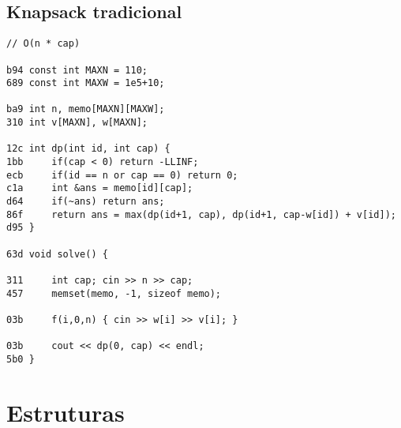 \documentclass[11pt, a4paper, twoside]{article}
\begin{document}
\subsection{Knapsack tradicional}
\begin{lstlisting}
// O(n * cap)

b94 const int MAXN = 110;
689 const int MAXW = 1e5+10;

ba9 int n, memo[MAXN][MAXW];
310 int v[MAXN], w[MAXN];

12c int dp(int id, int cap) {
1bb 	if(cap < 0) return -LLINF;
ecb 	if(id == n or cap == 0) return 0;
c1a 	int &ans = memo[id][cap];
d64 	if(~ans) return ans;
86f 	return ans = max(dp(id+1, cap), dp(id+1, cap-w[id]) + v[id]);
d95 }

63d void solve() {
    
311 	int cap; cin >> n >> cap;
457 	memset(memo, -1, sizeof memo);
    
03b 	f(i,0,n) { cin >> w[i] >> v[i]; }
    
03b 	cout << dp(0, cap) << endl; 
5b0 }
\end{lstlisting}



%
%

\section{Estruturas}
\end{document}
